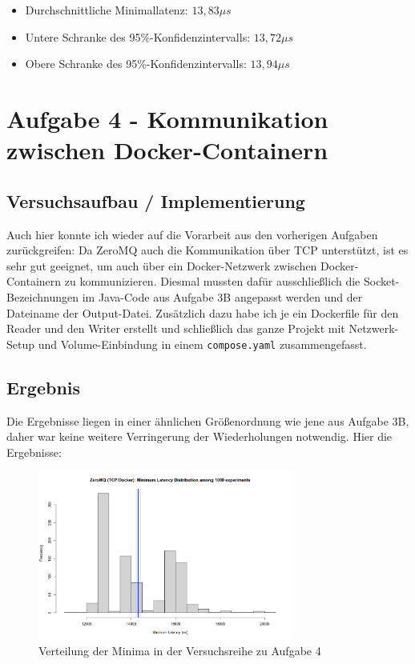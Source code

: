 \documentclass[12pt]{article}
\begin{document}
\begin{itemize}
	\item Durchschnittliche Minimallatenz: $13,83 \mu s$
	\item Untere Schranke des 95\%-Konfidenzintervalls: $13,72 \mu s$
	\item Obere Schranke des 95\%-Konfidenzintervalls: $13,94 \mu s$
\end{itemize}

\section{Aufgabe 4 - Kommunikation zwischen Docker-Containern}
\subsection{Versuchsaufbau / Implementierung}
Auch hier konnte ich wieder auf die Vorarbeit aus den vorherigen Aufgaben zurückgreifen:
Da ZeroMQ auch die Kommunikation über TCP unterstützt, ist es sehr gut geeignet, um auch über ein Docker-Netzwerk zwischen Docker-Containern zu kommunizieren.
Diesmal mussten dafür ausschließlich die Socket-Bezeichnungen im Java-Code aus Aufgabe 3B angepasst werden und der Dateiname der Output-Datei.
Zusätzlich dazu habe ich je ein Dockerfile für den Reader und den Writer erstellt und schließlich das ganze Projekt mit Netzwerk-Setup und Volume-Einbindung in einem \texttt{compose.yaml} zusammengefasst.

\subsection{Ergebnis}
Die Ergebnisse liegen in einer ähnlichen Größenordnung wie jene aus Aufgabe 3B, daher war keine weitere Verringerung der Wiederholungen notwendig.
Hier die Ergebnisse:
\begin{figure}[H]
	\centering
	\includegraphics[width=0.75\textwidth]{./img/zeromq_docker}
	\caption{Verteilung der Minima in der Versuchsreihe zu Aufgabe 4}
	\label{img:zeromq:docker}
\end{figure}
\end{document}
